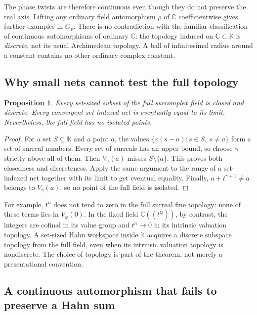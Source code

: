 \documentclass[11pt]{article}
\newtheorem{proposition}[theorem]{Proposition}
\theoremstyle{definition}
\theoremstyle{remark}
\newcommand{\C}{\mathbb C}
\newcommand{\Q}{\mathbb Q}
\newcommand{\K}{\mathbb K}
\numberwithin{equation}{section}
\begin{document}
The phase twists are therefore continuous even though they do not preserve
the real axis. Lifting any ordinary field automorphism $\rho$ of $\C$
coefficientwise gives further examples in $G_v$. There is no contradiction
with the familiar classification of continuous automorphisms of ordinary
$\C$: the topology induced on $\C\subset\K$ is \emph{discrete}, not its
usual Archimedean topology. A ball of infinitesimal radius around a constant
contains no other ordinary complex constant.

\subsection{Why small nets cannot test the full topology}

\begin{proposition}\label{saut:prop:discrete}
Every set-sized subset of the full surcomplex field is closed and discrete.
Every convergent set-indexed net is eventually equal to its limit.
Nevertheless, the full field has no isolated points.
\end{proposition}
\begin{proof}
For a set $S\subseteq\K$ and a point $a$, the values
$\{v(s-a):s\in S,\ s\ne a\}$ form a set of surreal numbers. Every set of
surreals has an upper bound, so choose $\gamma$ strictly above all of them.
Then $V_\gamma(a)$ misses $S\setminus\{a\}$. This proves both closedness
and discreteness. Apply the same argument to the range of a set-indexed
net together with its limit to get eventual equality. Finally,
$a+t^{\gamma+1}\ne a$ belongs to $V_\gamma(a)$, so no point of the full
field is isolated.
\end{proof}

For example, $t^n$ does not tend to zero in the full surreal fine topology:
none of these terms lies in $V_\omega(0)$. In the fixed field
$\C((t^\Q))$, by contrast, the integers are cofinal in its value group
and $t^n\to0$ in its intrinsic valuation topology.
A set-sized Hahn workspace inside $\K$ acquires a discrete subspace
topology from the full field, even when its intrinsic valuation topology
is nondiscrete. The choice of topology is part of the theorem, not merely
a presentational convention.

\subsection{A continuous automorphism that fails to preserve a Hahn sum}
\end{document}
